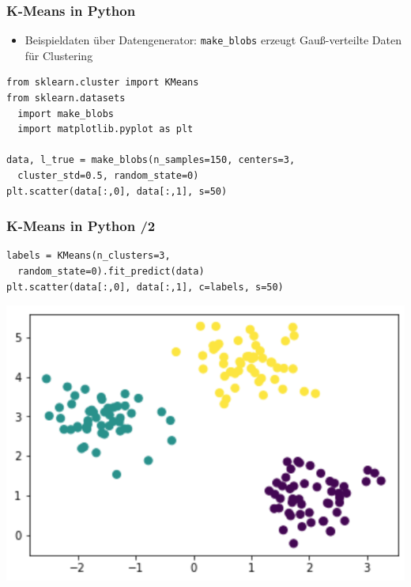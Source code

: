 \begin{frame}[fragile]
\frametitle{K-Means in Python}

\begin{itemize}
\item Beispieldaten über Datengenerator: \texttt{make\_blobs} erzeugt Gauß-verteilte Daten für Clustering
\end{itemize}
\begin{verbatim}
from sklearn.cluster import KMeans
from sklearn.datasets
  import make_blobs
  import matplotlib.pyplot as plt

data, l_true = make_blobs(n_samples=150, centers=3,
  cluster_std=0.5, random_state=0)
plt.scatter(data[:,0], data[:,1], s=50)
\end{verbatim}


\end{frame}

\begin{frame}[fragile]
\frametitle{K-Means in Python /2}

\begin{verbatim}
labels = KMeans(n_clusters=3,
  random_state=0).fit_predict(data)
plt.scatter(data[:,0], data[:,1], c=labels, s=50)
\end{verbatim}

\begin{center}
\includegraphics[scale=.5]{fig7/kmeans-blob.png}
\end{center}

\end{frame}


